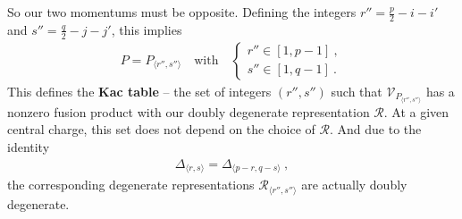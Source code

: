 \documentclass[12pt, a4paper, notitlepage, twoside]{report}
\numberwithin{equation}{section}
\theoremstyle{break}
\begin{document}
So our two momentums must be opposite. Defining the integers $r'' = \frac{p}{2}-i-i'$ and $s''=\frac{q}{2}-j-j'$, this implies
\begin{align}
 P=P_{\langle r'',s'' \rangle}\quad \text{with}\quad  \left\{\begin{array}{l}  r'' \in [1,p-1]\ , \\ s'' \in [1,q-1]\ . \end{array}\right. 
\label{rpsq}
\end{align}
This defines the \textbf{\boldmath Kac table} -- the set of integers $(r'',s'')$ such that $\mathcal{V}_{P_{\langle r'',s''\rangle}}$ has a nonzero fusion product with our doubly degenerate representation $\mathcal{R}$.
At a given central charge, this set does not depend on the choice of $\mathcal{R}$. 
And due to the identity 
\begin{align}
 \Delta_{\langle r,s \rangle}=\Delta_{\langle p-r,q-s \rangle}\ ,
 \label{ddr}
\end{align}
the corresponding degenerate representations $\mathcal{R}_{\langle r'', s'' \rangle}$ are actually doubly degenerate. 
\end{document}
